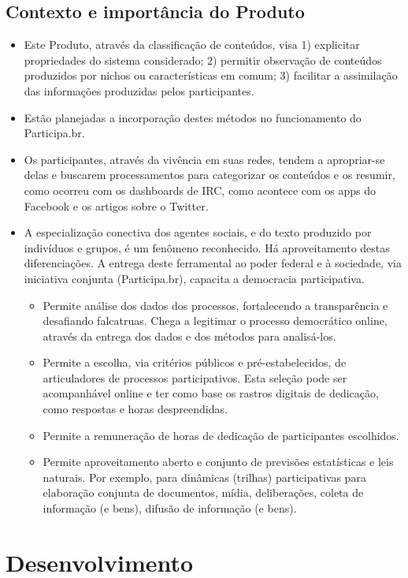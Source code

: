\documentclass[12pt]{article}
\begin{document}
\subsection{Contexto e importância do Produto}
\begin{itemize}
    \item Este Produto, através da classificação de conteúdos, visa 1) explicitar propriedades do sistema considerado; 2) permitir observação de conteúdos produzidos por nichos ou características em comum; 3) facilitar a assimilação das informações produzidas pelos participantes.
    \item Estão planejadas a incorporação destes métodos no funcionamento do Participa.br.
    \item Os participantes, através da vivência em suas redes, tendem a apropriar-se delas e buscarem processamentos para categorizar os conteúdos e os resumir, como ocorreu com os dashboards de IRC, como acontece com os apps do Facebook e os artigos sobre o Twitter.
    \item A especialização conectiva dos agentes sociais, e do texto produzido por indivíduos e grupos, é um fenômeno reconhecido. Há aproveitamento destas diferenciações. A entrega deste ferramental ao poder federal e à sociedade, via iniciativa conjunta (Participa.br), capacita a democracia participativa.
\begin{itemize}
        \item Permite análise dos dados dos processos, fortalecendo a transparência e desafiando falcatruas. Chega a legitimar o processo democrático online, através da entrega dos dados e dos métodos para analisá-los.
        \item Permite a escolha, via critérios públicos e pré-estabelecidos, de articuladores de processos participativos. Esta seleção pode ser acompanhável online e ter como base os rastros digitais de dedicação, como respostas e horas despreendidas.
        \item Permite a remuneração de horas de dedicação de participantes escolhidos.
        \item Permite aproveitamento aberto e conjunto de previsões estatísticas e leis naturais. Por exemplo, para dinâmicas (trilhas) participativas para elaboração conjunta de documentos, mídia, deliberações, coleta de informação (e bens), difusão de informação (e bens).
\end{itemize}
\end{itemize}


\section{Desenvolvimento}
\end{document}
